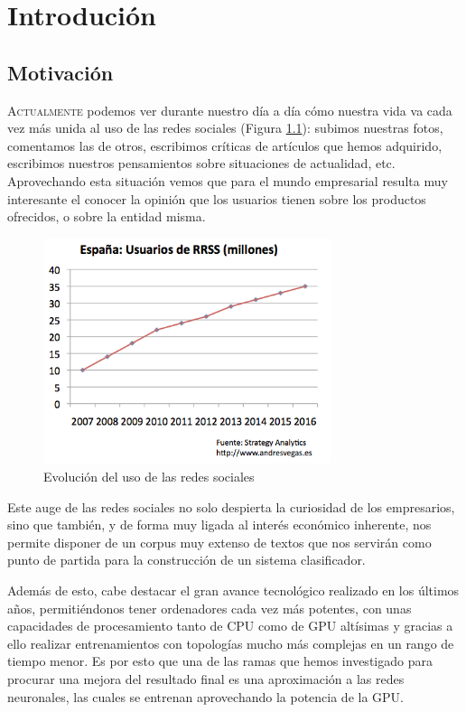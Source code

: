 \chapter{Introdución}
\label{chap:introducion}


\section{Motivación}
\lettrine{A}{ctualmente} podemos ver durante nuestro día a día cómo nuestra vida va cada vez más unida al uso de las redes sociales (Figura \ref{evorss}): subimos nuestras fotos, comentamos las de otros, escribimos críticas de artículos que hemos adquirido, escribimos nuestros pensamientos sobre situaciones de actualidad, etc. Aprovechando esta situación vemos que para el mundo empresarial resulta muy interesante el conocer la opinión que los usuarios tienen sobre los productos ofrecidos, o sobre la entidad misma.

\begin{figure}[!ht]
	\centering
	\includegraphics[width=0.75\textwidth]{imaxes/evorss.png}
	\caption{Evolución del uso de las redes sociales}
	\label{evorss}
\end{figure}

Este auge de las redes sociales no solo despierta la curiosidad de los empresarios, sino que también, y de forma muy ligada al interés económico inherente, nos permite disponer de un corpus muy extenso de textos que nos servirán como punto de partida para la construcción de un sistema clasificador.

Además de esto, cabe destacar el gran avance tecnológico realizado en los últimos años, permitiéndonos tener ordenadores cada vez más potentes, con unas capacidades de procesamiento tanto de CPU como de GPU altísimas y gracias a ello realizar entrenamientos con topologías mucho más complejas en un rango de tiempo menor. Es por esto que una de las ramas que hemos investigado para procurar una mejora del resultado final es una aproximación a las redes neuronales, las cuales se entrenan aprovechando la potencia de la GPU.

